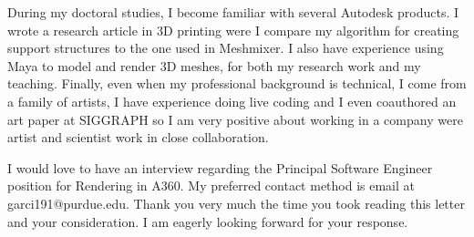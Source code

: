 \documentclass[10pt,stdletter,dateno,sigleft,letterpaper]{newlfm} %
\begin{document}
\begin{newlfm}
During my doctoral studies, I become familiar with several Autodesk products. I wrote a research article in 3D printing were I compare my algorithm for creating support structures to the one used in Meshmixer. I also have experience using Maya to model and render 3D meshes, for both my research work and my teaching. Finally, even when my professional background is technical, I come from a family of artists, I have experience doing live coding and I even coauthored an art paper at SIGGRAPH so I am very positive about working in a company were artist and scientist work in close collaboration.


I would love to have an interview regarding the Principal Software Engineer position for Rendering in A360. My preferred contact method is email at garci191@purdue.edu. Thank you very much the time you took reading this letter and your consideration. I am eagerly looking forward for your response.


\end{newlfm}
\end{document}
